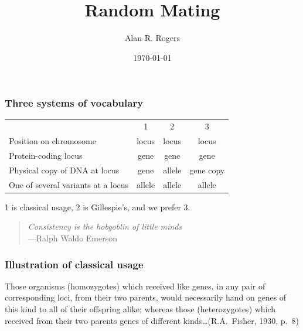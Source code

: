 \documentclass[handout]{beamer}
\title{Random Mating}
\author{Alan R. Rogers}
\date{\today}
\begin{document}
\frame{\titlepage}

\begin{frame}
\frametitle{Three systems of vocabulary}
\begin{tabular}{p{2.2in}ccc}
                        &   1   & 2 & 3\\
Position on chromosome  & locus & locus & locus\\
Protein-coding locus    & gene  & gene & gene\\
Physical copy of DNA at locus  & gene  & allele &gene copy\\
One of several variants at a locus& allele & allele & allele\\
\end{tabular}

\bigskip

1 is classical usage, 2 is Gillespie's, and we prefer 3.

\bigskip

\pause
\begin{quote}
\emph{Consistency is the hobgoblin of little minds\\}
\mbox{}\hfill---Ralph Waldo Emerson
\end{quote}
\end{frame}

\begin{frame}
\frametitle{Illustration of classical usage}
Those organisms (homozygotes) which received like genes, in any pair
of corresponding loci, from their two parents, would necessarily hand
on genes of this kind to all of their offspring alike; whereas those
(heterozygotes) which received from their two parents genes of
different kinds\ldots (R.A.\ Fisher, 1930, p.~8)
\end{frame}
\end{document}
